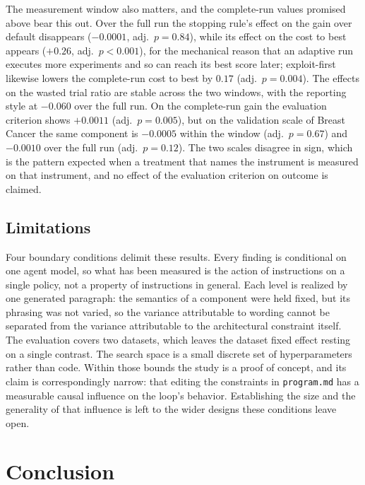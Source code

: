 \documentclass[11pt]{article}
\begin{document}
The measurement window also matters, and the complete-run values promised above bear this out. Over the full run the stopping rule's effect on the gain over default disappears ($-0.0001$, adj.\ $p=0.84$), while its effect on the cost to best appears ($+0.26$, adj.\ $p<0.001$), for the mechanical reason that an adaptive run executes more experiments and so can reach its best score later; exploit-first likewise lowers the complete-run cost to best by $0.17$ (adj.\ $p=0.004$). The effects on the wasted trial ratio are stable across the two windows, with the reporting style at $-0.060$ over the full run. On the complete-run gain the evaluation criterion shows $+0.0011$ (adj.\ $p=0.005$), but on the validation scale of Breast Cancer the same component is $-0.0005$ within the window (adj.\ $p=0.67$) and $-0.0010$ over the full run (adj.\ $p=0.12$). The two scales disagree in sign, which is the pattern expected when a treatment that names the instrument is measured on that instrument, and no effect of the evaluation criterion on outcome is claimed.

\subsection{Limitations}

Four boundary conditions delimit these results. Every finding is conditional on one agent model, so what has been measured is the action of instructions on a single policy, not a property of instructions in general. Each level is realized by one generated paragraph: the semantics of a component were held fixed, but its phrasing was not varied, so the variance attributable to wording cannot be separated from the variance attributable to the architectural constraint itself. The evaluation covers two datasets, which leaves the dataset fixed effect resting on a single contrast. The search space is a small discrete set of hyperparameters rather than code. Within those bounds the study is a proof of concept, and its claim is correspondingly narrow: that editing the constraints in \texttt{program.md} has a measurable causal influence on the loop's behavior. Establishing the size and the generality of that influence is left to the wider designs these conditions leave open.


\section{Conclusion}
\label{sec:conclusion}
\end{document}
